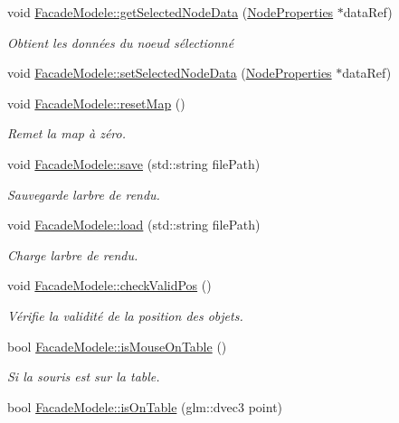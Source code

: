 \begin{DoxyCompactItemize}
void \hyperlink{group__inf2990_ga7dfe6c0df984dd4d2c5402d9fab0fc75}{Facade\+Modele\+::get\+Selected\+Node\+Data} (\hyperlink{struct_node_properties}{Node\+Properties} $\ast$data\+Ref)
\begin{DoxyCompactList}\small\item\em Obtient les données du noeud sélectionné \end{DoxyCompactList}\item 
void \hyperlink{group__inf2990_gae40b907a6c30f55176cde6b1736eaf72}{Facade\+Modele\+::set\+Selected\+Node\+Data} (\hyperlink{struct_node_properties}{Node\+Properties} $\ast$data\+Ref)
\item 
void \hyperlink{group__inf2990_gace5ff9435d6bcf501298d401207733bf}{Facade\+Modele\+::reset\+Map} ()
\begin{DoxyCompactList}\small\item\em Remet la map à zéro. \end{DoxyCompactList}\item 
void \hyperlink{group__inf2990_ga32032b986fdb830fb158dbd354aa55e7}{Facade\+Modele\+::save} (std\+::string file\+Path)
\begin{DoxyCompactList}\small\item\em Sauvegarde l\textquotesingle{}arbre de rendu. \end{DoxyCompactList}\item 
void \hyperlink{group__inf2990_ga4a34752db2d5c26cf97baca584c27dec}{Facade\+Modele\+::load} (std\+::string file\+Path)
\begin{DoxyCompactList}\small\item\em Charge l\textquotesingle{}arbre de rendu. \end{DoxyCompactList}\item 
void \hyperlink{group__inf2990_ga612cbe4c05f2e8adfb632db4fb1a3cf0}{Facade\+Modele\+::check\+Valid\+Pos} ()
\begin{DoxyCompactList}\small\item\em Vérifie la validité de la position des objets. \end{DoxyCompactList}\item 
bool \hyperlink{group__inf2990_gaaaa7ff115548c42faa0570a3c7c4648e}{Facade\+Modele\+::is\+Mouse\+On\+Table} ()
\begin{DoxyCompactList}\small\item\em Si la souris est sur la table. \end{DoxyCompactList}\item 
\hypertarget{group__inf2990_ga58f9c6d2f80118bcdf95e1967a455bea}{}bool \hyperlink{group__inf2990_ga58f9c6d2f80118bcdf95e1967a455bea}{Facade\+Modele\+::is\+On\+Table} (glm\+::dvec3 point)\label{group__inf2990_ga58f9c6d2f80118bcdf95e1967a455bea}


\end{DoxyCompactItemize}
